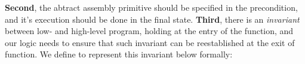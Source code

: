 \textbf{Second}, the abtract assembly primitive should be
specified in the precondition, and it's execution
should be done in the final state.
\textbf{Third}, there is an {\it invariant}
between low- and high-level program, holding at the entry of
the function, and our logic needs to ensure that such invariant
can be reestablished at the exit of function.
% 
We define \INV{} to represent this invariant below formally:
